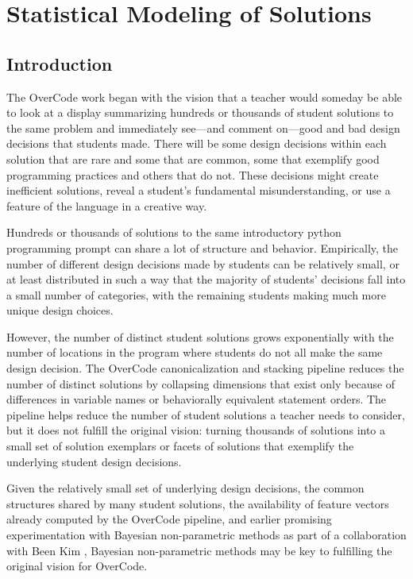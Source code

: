 \chapter{Statistical Modeling of Solutions}\label{chapter:bayesian}

\section{Introduction}

The OverCode work began with the vision that a teacher would someday be able to look at a display summarizing hundreds or thousands of student solutions to the same problem and immediately see---and comment on---good and bad design decisions that students made. There will be some design decisions within each solution that are rare and some that are common, some that exemplify good programming practices and others that do not. These decisions might create inefficient solutions, reveal a student's fundamental misunderstanding, or use a feature of the language in a creative way.

Hundreds or thousands of solutions to the same introductory python programming prompt can share a lot of structure and behavior. Empirically, the number of different design decisions made by students can be relatively small, or at least distributed in such a way that the majority of students' decisions fall into a small number of categories, with the remaining students making much more unique design choices. 

However, the number of distinct student solutions grows exponentially with the number of locations in the program where students do not all make the same design decision. The OverCode canonicalization and stacking pipeline reduces the number of distinct solutions by collapsing dimensions that exist only because of differences in variable names or behaviorally equivalent statement orders. The pipeline helps reduce the number of student solutions a teacher needs to consider, but it does not fulfill the original vision: turning thousands of solutions into a small set of solution exemplars or facets of solutions that exemplify the underlying student design decisions.

Given the relatively small set of underlying design decisions, the common structures shared by many student solutions, the availability of feature vectors already computed by the OverCode pipeline, and earlier promising experimentation with Bayesian non-parametric methods as part of a collaboration with Been Kim \citet{kimthesis,kimtechreport}, Bayesian non-parametric methods may be key to fulfilling the original vision for OverCode.

